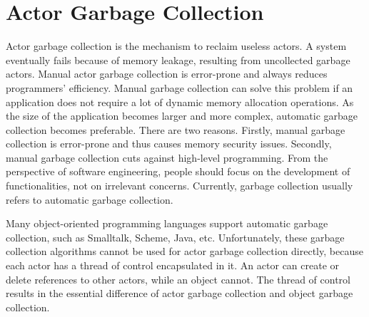 \chapter{Actor Garbage Collection}\label{actorGarbageCollection}
Actor garbage collection is the mechanism to reclaim useless
actors. A system eventually fails because of memory leakage, 
resulting from uncollected garbage actors. Manual actor garbage collection 
is error-prone and always reduces 
programmers' efficiency.
Manual garbage collection can solve this problem if an application does not require a
lot of dynamic memory allocation operations. As the size of the application becomes
larger and more complex, automatic garbage collection becomes preferable. There
are two reasons. Firstly, manual garbage collection is error-prone and thus causes
memory security issues. Secondly, manual garbage collection cuts against high-level
programming. From the perspective of software engineering, people should focus on
the development of functionalities, not on irrelevant concerns. Currently, garbage
collection usually refers to automatic garbage collection.

Many object-oriented programming languages support automatic 
garbage collection, such as Smalltalk, Scheme, Java, etc.
Unfortunately, these garbage collection algorithms cannot be 
used for actor garbage collection directly, because each actor 
has a thread of control 
encapsulated in it. An actor can create or delete 
references to other actors, while an object cannot. The thread of 
control results in the essential difference of
actor garbage collection and object garbage collection. 


